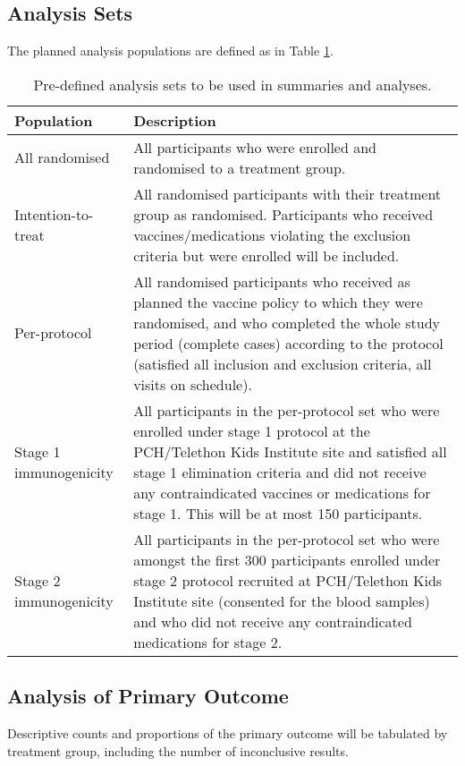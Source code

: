 \documentclass{bmcart}
\begin{document}
\subsection*{Analysis Sets}

The planned analysis populations are defined as in Table \ref{tab:analysis-sets}.

\begin{table}[h!]
	\caption{Pre-defined analysis sets to be used in summaries and analyses.}
	\label{tab:analysis-sets}
	\begin{tabular}{lp{8cm}}
		Population & Description \\ \hline
		All randomised & All participants who were enrolled and randomised to a treatment group. \\
		Intention-to-treat & All randomised participants with their treatment group as randomised. Participants who received vaccines/medications violating the exclusion criteria but were enrolled will be included. \\
		Per-protocol & All randomised participants who received as planned the vaccine policy to which they were randomised, and who completed the whole study period (complete cases) according to the protocol (satisfied all inclusion and exclusion criteria, all visits on schedule).
		\\
		Stage 1 immunogenicity & All participants in the per-protocol set who were enrolled under stage 1 protocol at the PCH/Telethon Kids Institute site and satisfied all stage 1 elimination criteria and did not receive any contraindicated vaccines or medications for stage 1. This will be at most 150 participants. \\
		Stage 2 immunogenicity & All participants in the per-protocol set who were amongst the first 300 participants enrolled under stage 2 protocol recruited at PCH/Telethon Kids Institute site (consented for the blood samples) and who did not receive any contraindicated medications for stage 2. \\
		\hline
	\end{tabular}
\end{table}

\subsection*{Analysis of Primary Outcome}

Descriptive counts and proportions of the primary outcome will be tabulated by treatment group, including the number of inconclusive results.
\end{document}
